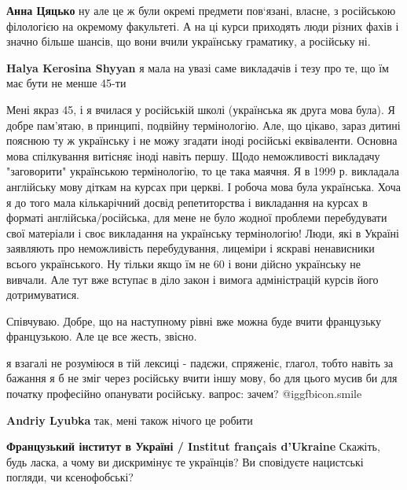 \begin{itemize}
\begin{itemize}
\textbf{Анна Цяцько} ну але це ж були окремі предмети пов‘язані, власне, з російською філологією на окремому факультеті. А на ці курси приходять люди різних фахів і значно більше шансів, що вони вчили українську граматику, а російську ні.

\textbf{Halya Kerosina Shyyan} я мала на увазі саме викладачів і тезу про те, що їм має бути не менше 45-ти


Мені якраз 45, і я вчилася у російській школі (українська як друга мова була).
Я добре пам'ятаю, в принципі, подвійну термінологію. Але, що цікаво, зараз
дитині пояснюю ту ж українську і не можу згадати іноді російські еквіваленти.
Основна мова спілкування витісняє іноді навіть першу. Щодо неможливості
викладачу "заговорити" українською термінологію, то це така маячня. Я в 1999 р.
викладала англійську мову діткам на курсах при церкві. І робоча мова була
українська. Хоча я до того мала кількарічний досвід репетиторства і викладання
на курсах в форматі англійська/російська, для мене не було жодної проблеми
перебудувати свої матеріали і своє викладання на українську термінологію! Люди,
які в Україні заявляють про неможливість перебудування, лицеміри і яскраві
ненависники всього українського. Ну тільки якщо їм не 60 і вони дійсно
українську не вивчали. Але тут вже вступає в діло закон і вимога адміністрацій
курсів його дотримуватися.

\end{itemize} %

Співчуваю. Добре, що на наступному рівні вже можна буде вчити французьку французькою. Але це все жесть, звісно.


я взагалі не розуміюся в тій лексиці - падєжи, спряженіє, глагол, тобто навіть
за бажання я б не зміг через російську вчити іншу мову, бо для цього мусив би
для початку професійно опанувати російську. вапрос: зачем?  @igg{fbicon.smile} 

\begin{itemize} %
\textbf{Andriy Lyubka} так, мені також нічого це робити
\end{itemize} %

\textbf{Французький інститут в Україні / Institut français d'Ukraine}
Скажіть, будь ласка, а чому ви дискримінує те українців? Ви сповідуєте нацистські погляди, чи ксенофобські?


\end{itemize}
